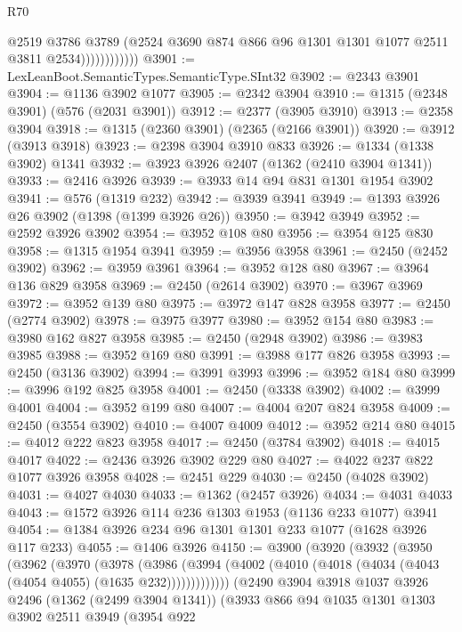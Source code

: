 \begin{lexlean}{R70}
\begin{coremodule}
                          @2519
                          @3786
                          @3789
                          (@2524 @3690 @874 @866 @96 @1301 @1301 @1077 @2511 @3811 @2534))))))))))))
@3901 := LexLeanBoot.SemanticTypes.SemanticType.SInt32
@3902 := @2343 @3901
@3904 := @1136 @3902 @1077
@3905 := @2342 @3904
@3910 := @1315 (@2348 @3901) (@576 (@2031 @3901))
@3912 := @2377 (@3905 @3910)
@3913 := @2358 @3904
@3918 := @1315 (@2360 @3901) (@2365 (@2166 @3901))
@3920 := @3912 (@3913 @3918)
@3923 := @2398 @3904 @3910 @833
@3926 := @1334 (@1338 @3902) @1341
@3932 := @3923 @3926 @2407 (@1362 (@2410 @3904 @1341))
@3933 := @2416 @3926
@3939 := @3933 @14 @94 @831 @1301 @1954 @3902
@3941 := @576 (@1319 @232)
@3942 := @3939 @3941
@3949 := @1393 @3926 @26 @3902 (@1398 (@1399 @3926 @26))
@3950 := @3942 @3949
@3952 := @2592 @3926 @3902
@3954 := @3952 @108 @80
@3956 := @3954 @125 @830
@3958 := @1315 @1954 @3941
@3959 := @3956 @3958
@3961 := @2450 (@2452 @3902)
@3962 := @3959 @3961
@3964 := @3952 @128 @80
@3967 := @3964 @136 @829 @3958
@3969 := @2450 (@2614 @3902)
@3970 := @3967 @3969
@3972 := @3952 @139 @80
@3975 := @3972 @147 @828 @3958
@3977 := @2450 (@2774 @3902)
@3978 := @3975 @3977
@3980 := @3952 @154 @80
@3983 := @3980 @162 @827 @3958
@3985 := @2450 (@2948 @3902)
@3986 := @3983 @3985
@3988 := @3952 @169 @80
@3991 := @3988 @177 @826 @3958
@3993 := @2450 (@3136 @3902)
@3994 := @3991 @3993
@3996 := @3952 @184 @80
@3999 := @3996 @192 @825 @3958
@4001 := @2450 (@3338 @3902)
@4002 := @3999 @4001
@4004 := @3952 @199 @80
@4007 := @4004 @207 @824 @3958
@4009 := @2450 (@3554 @3902)
@4010 := @4007 @4009
@4012 := @3952 @214 @80
@4015 := @4012 @222 @823 @3958
@4017 := @2450 (@3784 @3902)
@4018 := @4015 @4017
@4022 := @2436 @3926 @3902 @229 @80
@4027 := @4022 @237 @822 @1077 @3926 @3958
@4028 := @2451 @229
@4030 := @2450 (@4028 @3902)
@4031 := @4027 @4030
@4033 := @1362 (@2457 @3926)
@4034 := @4031 @4033
@4043 := @1572 @3926 @114 @236 @1303 @1953 (@1136 @233 @1077) @3941
@4054 := @1384 @3926 @234 @96 @1301 @1301 @233 @1077 (@1628 @3926 @117 @233)
@4055 := @1406 @3926
@4150 := @3900
    (@3920
      (@3932
        (@3950
          (@3962
            (@3970
              (@3978
                (@3986
                  (@3994 (@4002 (@4010 (@4018 (@4034 (@4043 (@4054 @4055) (@1635 @232)))))))))))))
      (@2490
        @3904
        @3918
        @1037
        @3926
        @2496
        (@1362 (@2499 @3904 @1341))
        (@3933
          @866
          @94
          @1035
          @1301
          @1303
          @3902
          @2511
          @3949
          (@3954
            @922

\end{coremodule}
\end{lexlean}
